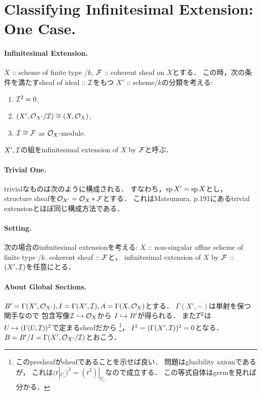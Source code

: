\documentclass[a4paper]{jsarticle}
\begin{document}
\section{Classifying Infinitesimal Extension: One Case.} %
    \paragraph{Infinitesimal Extension.}
    $X$ :: scheme of finite type /$k$,
    $\mathcal{F}$ :: coherent sheaf on $X$とする．
    この時，次の条件を満たすsheaf of ideal :: $\mathcal{I}$をもつ
    $X'$ :: scheme/$k$の分類を考える:
    \begin{enumerate}
        \item $\mathcal{I}^2=0$,
        \item $(X', \mathcal{O}_{X'}/\mathcal{I}) \cong (X, \mathcal{O}_X)$,
        \item $\mathcal{I} \cong \mathcal{F}$ as $\mathcal{O}_X$-module.
    \end{enumerate}
    $X', \mathcal{I}$の組をinfinitesimal extension of $X$ by $\mathcal{F}$と呼ぶ．
    
    \paragraph{Trivial One.}
    trivialなものは次のように構成される．
    すなわち，$\operatorname{sp} X'=\operatorname{sp} X$とし，
    structure sheafを$\mathcal{O}_{X'}=\mathcal{O}_X \ast \mathcal{F}$とする．
    これはMatsumura, p.191にあるtrivial extensionとほぼ同じ構成方法である．

    \paragraph{Setting.}
    次の場合のinfinitesimal extensionを考える:
    $X$ :: non-singular affine scheme of finite type /$k$.
    coherent sheaf :: $\mathcal{F}$と，
    infinitesimal extension of $X$ by $\mathcal{F}$ :: $(X', \mathcal{I})$を任意にとる．

    \paragraph{About Global Sections.}
    $B'=\Gamma(X', \mathcal{O}_{X'}), I=\Gamma(X', \mathcal{I}), A=\Gamma(X, \mathcal{O}_X)$とする．
    $\Gamma(X',-)$は単射を保つ関手なので
    包含写像$\mathcal{I} \hookrightarrow \mathcal{O}_X$から
    $I \hookrightarrow B'$が得られる．
    また$\mathcal{I}^2$は$U \mapsto (\Gamma(U, \mathcal{I}))^2$で定まるsheafだから
    \footnote
    {
        このpresheafがsheafであることを示せば良い．
        問題はgluability axiomであるが，
        これは$(t|_{U_i})^2=(t^2)|_{U_i}$なので成立する．
        この等式自体はgermを見れば分かる．
    }，
    $I^2=(\Gamma(X', \mathcal{I}))^2=0$となる．
    $B=B'/I=\Gamma(X', \mathcal{O}_{X'}/\mathcal{I})$とおこう．
\end{document}
